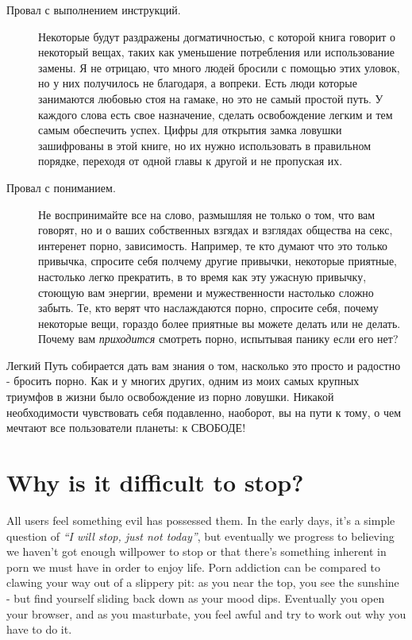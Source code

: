 \documentclass[
]{book}
\begin{document}
\begin{description}
\item[Провал с выполнением инструкций.]
Некоторые будут раздражены догматичностью, с которой книга говорит о некоторый вещах, таких как уменьшение потребления или использование замены. Я не отрицаю, что много людей бросили с помощью этих уловок, но у них получилось не благодаря, а вопреки. Есть люди которые занимаются любовью стоя на гамаке, но это не самый простой путь. У каждого слова есть свое назначение, сделать освобождение легким и тем самым обеспечить успех. Цифры для открытия замка ловушки зашифрованы в этой книге, но их нужно использовать в правильном порядке, переходя от одной главы к другой и не пропуская их.
\item[Провал с пониманием.]
Не воспринимайте все на слово, размышляя не только о том, что вам говорят, но и о ваших собственных взгядах и взглядах общества на секс, интеренет порно, зависимость. Например, те кто думают что это только привычка, спросите себя полчему другие привычки, некоторые приятные, настолько легко прекратить, в то время как эту ужасную привычку, стоющую вам энергии, времени и мужественности настолько сложно забыть. Те, кто верят что наслаждаются порно, спросите себя, почему некоторые вещи, гораздо более приятные вы можете делать или не делать. Почему вам \emph{приходится} смотреть порно, испытывая панику если его нет?
\end{description}

Легкий Путь собирается дать вам знания о том, насколько это просто и радостно - бросить порно. Как и у многих других, одним из моих самых крупных триумфов в жизни было освобождение из порно ловушки. Никакой необходимости чувствовать себя подавленно, наоборот, вы на пути к тому, о чем мечтают все пользователи планеты: к СВОБОДЕ!

\hypertarget{why-is-it-difficult-to-stop}{%
\chapter{Why is it difficult to stop?}\label{why-is-it-difficult-to-stop}}

All users feel something evil has possessed them. In the early days, it's a simple question of \emph{``I will stop, just not today''}, but eventually we progress to believing we haven't got enough willpower to stop or that there's something inherent in porn we must have in order to enjoy life. Porn addiction can be compared to clawing your way out of a slippery pit: as you near the top, you see the sunshine - but find yourself sliding back down as your mood dips. Eventually you open your browser, and as you masturbate, you feel awful and try to work out why you have to do it.
\end{document}
